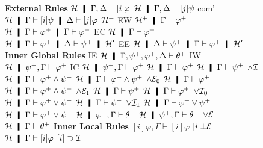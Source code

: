 {\begin{figure}
 \small
\centering
  \textbf{External Rules}
   \vskip 2mm
   \BinaryRule
   {$\hyper\hmid\Gamma,\Delta\vdash[i]\varphi$}
   {$\hyper\hmid\Gamma,\Delta\vdash[j]\psi$}
   {com'}
   {$\hyper\hmid\Gamma\vdash[i]\psi\hmid\Delta\vdash[j]\varphi$}
  \hfill
 \UnaryRule
 {$\mathcal{H}^+$}
 {EW}
 {$\hyper^+\hmid\Gamma\vdash \m\varphi$}
 \vskip 2mm
 \UnaryRule
 {$\hyper\hmid\Gamma\vdash \m\varphi\hmid\Gamma\vdash \m\varphi$}
 {EC}
 {$\hyper\hmid\Gamma\vdash \m\varphi$}
 \hfill
 \UnaryRule
 {$\hyper\hmid\Gamma\vdash \m\varphi\hmid\Delta\vdash \m\psi\hmid \hyper'$}
 {EE}
 {$\hyper\hmid\Delta\vdash \m\psi   \hmid\Gamma\vdash \m\varphi\hmid
   \hyper'$}
 \vskip 2mm
\textbf{Inner Global Rules}
\vskip 2mm
   \UnaryRule{$\hyper\hmid\Gamma,\m\varphi,\m\psi,\Delta\vdash\m\theta$}
   {IE}
   {$\hyper\hmid\Gamma,\m\psi,\m\varphi,\Delta\vdash \m\theta$}
   \hfill
   \UnaryRule{$\hyper\hmid\Gamma\vdash\m\varphi$}
   {IW}
   {$\hyper\hmid\m\psi,\Gamma\vdash\m\varphi$}
   \hfill
   \UnaryRule{$\hyper\hmid\m\psi,\m\psi,\Gamma\vdash\m\varphi$}
   {IC}
   {$\hyper\hmid\m\psi,\Gamma\vdash\m\varphi$}
   \vskip 2mm
  \BinaryRule
   {$\hyper\hmid\Gamma\vdash \m\varphi$}
   {$\hyper\hmid\Gamma\vdash \m\psi$}
   {$\wedge\mathcal I$}
   {$\hyper\hmid\Gamma\vdash \m\varphi\wedge\m\psi$}
   \vskip 2mm
  \UnaryRule
   {$\hyper\hmid\Gamma\vdash \m\varphi\wedge\m\psi$}
   {$\wedge\mathcal E_0$}
   {$\hyper\hmid\Gamma\vdash \m\varphi$}
   \hfill
  \UnaryRule
   {$\hyper\hmid\Gamma\vdash\m\varphi\wedge\m\psi$}
   {$\wedge\mathcal E_1$}
   {$\hyper\hmid\Gamma\vdash\m\psi$}
\vskip 2mm
  \UnaryRule
   {$\hyper\hmid\Gamma\vdash\m\varphi$}
   {$\vee\mathcal I_0$}
   {$\hyper\hmid\Gamma\vdash\m\varphi\vee\m\psi$}
   \hfill
  \UnaryRule
   {$\hyper\hmid\Gamma\vdash\m\psi$}
   {$\vee\mathcal I_1$}
   {$\hyper\hmid\Gamma\vdash\m\varphi\vee\m\psi$}
\vskip 2mm
   \TrinaryRule
   {$\hyper\hmid\Gamma\vdash           \m\varphi\vee\m\psi$}
   {$\hyper\hmid\m\varphi, \Gamma\vdash\m\theta$}
   {$\hyper\hmid\m\psi,    \Gamma\vdash\m\theta$}
   {$\vee\mathcal E$}
   {$\hyper\hmid         \Gamma\vdash\m\theta$}
\vskip 2mm
\textbf{Inner Local Rules}
\vskip 2mm
   {$[i]\varphi,\Gamma\vdash [i]\varphi$}
   \hfill
 \UnaryRule{$\hyper\hmid\Gamma\vdash[i]\bot$}
   {$[i]\bot\mathcal E$}
   {$\hyper\hmid\Gamma\vdash[i]\varphi$}
   \vskip 2mm
  \UnaryRule{$\hyper\hmid[i]\varphi,\Gamma\vdash [i]\psi$}
  {$[i]\supset\mathcal I$}

\end{figure}}
